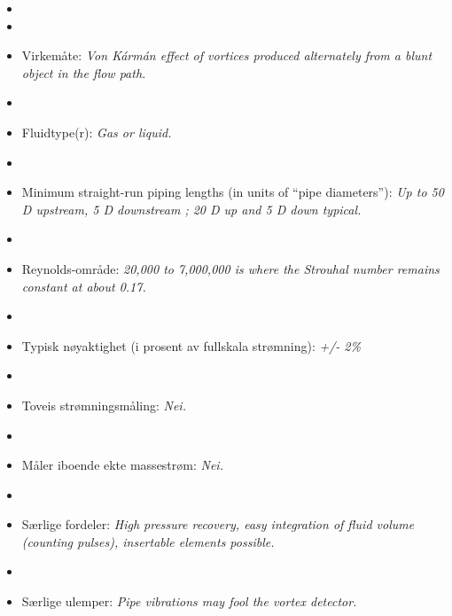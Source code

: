 \begin{itemize}
\goodbreak
\item{} 
\vskip 5pt
\item\item{} Virkemåte: {\it Von K\'arm\'an effect of vortices produced alternately from a blunt object in the flow path.}
\vskip 5pt
\item\item{} Fluidtype(r): {\it Gas or liquid.}
\vskip 5pt
\item\item{} Minimum straight-run piping lengths (in units of ``pipe diameters''): {\it Up to 50 D upstream, 5 D downstream ; 20 D up and 5 D down typical.}
\vskip 5pt
\item\item{} Reynolds-område: {\it 20,000 to 7,000,000 is where the Strouhal number remains constant at about 0.17.}
\vskip 5pt
\item\item{} Typisk nøyaktighet (i prosent av fullskala strømning): {\it +/- 2\%}
\vskip 5pt
\item\item{} Toveis strømningsmåling: {\it Nei.}
\vskip 5pt
\item\item{} Måler iboende ekte massestrøm: {\it Nei.}
\vskip 5pt
\item\item{} Særlige fordeler: {\it High pressure recovery, easy integration of fluid volume (counting pulses), insertable elements possible.}
\vskip 5pt
\item\item{} Særlige ulemper: {\it Pipe vibrations may fool the vortex detector.}
\end{itemize}

